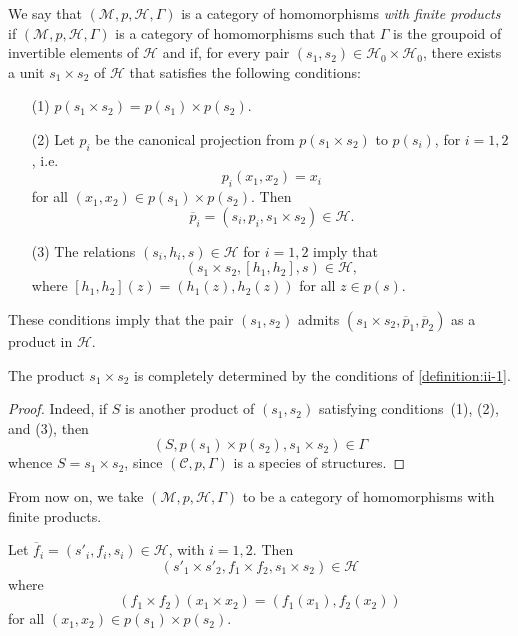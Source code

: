 \documentclass[a4paper,fleqn]{article}
\theoremstyle{plain}
\newenvironment{proposition}[1]
  {\renewcommand\theinnerproposition{#1}\innerproposition}
  {\endinnerproposition}
\theoremstyle{definition}
\newenvironment{definition}[1]
  {\renewcommand\theinnerdefinition{#1}\innerdefinition}
  {\endinnerdefinition}
\newcommand{\oldpage}[1]{{\marginpar{\footnotesize$\bigg\vert$\,\,\,\,\textit{p.~#1}}}}
\newcommand{\CC}{\mathcal{C}}
\newcommand{\HH}{\mathcal{H}}
\newcommand{\MM}{\mathcal{M}}
\begin{document}
\begin{definition}{1}
\label{definition:ii-1}
  We say that $(\MM,p,\HH,\Gamma)$ is a category of homomorphisms \emph{with finite products} if $(\MM,p,\HH,\Gamma)$ is a category of homomorphisms such that $\Gamma$ is the groupoid of invertible elements of $\HH$ and if, for every pair $(s_1,s_2)\in\HH_0\times\HH_0$, there exists a unit $s_1\times s_2$ of $\HH$ that satisfies the following conditions:

  \begin{enumerate}
    \item[\normalfont(1)]
      $p(s_1\times s_2)=p(s_1)\times p(s_2)$.

    \item[\normalfont(2)]
      Let $p_i$ be the canonical projection from $p(s_1\times s_2)$ to $p(s_i)$, for $i=1,2$, i.e.
      \[
        p_i(x_1,x_2) = x_i
      \]
      for all $(x_1,x_2)\in p(s_1)\times p(s_2)$.
      Then
      \[
        \overline{p}_i
        = (s_i,p_i,s_1\times s_2)
        \in\HH.
      \]

    \item[\normalfont(3)]
      The relations $(s_i,h_i,s)\in\HH$ for $i=1,2$ imply that
      \[
        (s_1\times s_2,[h_1,h_2],s)
        \in\HH,
      \]
      where $[h_1,h_2](z)=(h_1(z),h_2(z))$ for all $z\in p(s)$.
  \end{enumerate}
\end{definition}

These conditions imply that the pair $(s_1,s_2)$ admits $(s_1\times s_2,\overline{p}_1,\overline{p}_2)$ as a product \cite{4} in $\HH$.

\begin{proposition}{1}
\label{proposition:ii-1}
  The product $s_1\times s_2$ is completely determined by the conditions of \cref{definition:ii-1}.
\end{proposition}

\begin{proof}
  Indeed, if $S$ is another product of $(s_1,s_2)$ satisfying conditions~(1), (2), and (3), then
  \[
    (S,p(s_1)\times p(s_2),s_1\times s_2)
    \in\Gamma
  \]
  whence $S=s_1\times s_2$, since $(\CC,p,\Gamma)$ is a species of structures.
\end{proof}

From now on, we take $(\MM,p,\HH,\Gamma)$ to be a category of homomorphisms with finite products.

\begin{proposition}{2}
\label{proposition:ii-2}
  Let $\overline{f}_i=(s'_i,f_i,s_i)\in\HH$, with $i=1,2$.
  Then
  \[
    (s'_1\times s'_2, f_1\times f_2, s_1\times s_2)
    \in\HH
  \]
  \oldpage{382}
  where
  \[
    (f_1\times f_2)(x_1\times x_2)
    = (f_1(x_1),f_2(x_2))
  \]
  for all $(x_1,x_2)\in p(s_1)\times p(s_2)$.
\end{proposition}
\end{document}
